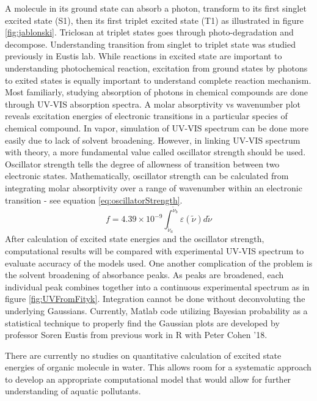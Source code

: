 \documentclass[
journal=jpcbfk, %
manuscript=article]{achemso}
\begin{document}
A molecule in its ground state can absorb a photon, transform to its first singlet excited state (S1), then its first triplet excited state (T1) as illustrated in figure \ref{fig:jablonski}. Triclosan at triplet states goes through photo-degradation and decompose. Understanding transition from singlet to triplet state was studied previously in Eustis lab.\cite{Ricke2014} While reactions in excited state are important to understanding photochemical reaction, excitation from ground states by photons to exited states is equally important to understand complete reaction mechanism. Most familiarly, studying absorption of photons in chemical compounds are done through UV-VIS absorption spectra. A molar absorptivity vs wavenumber plot reveals excitation energies of electronic transitions in a particular species of chemical compound. In vapor, simulation of UV-VIS spectrum can be done more easily due to lack of solvent broadening.\cite{Hirayama2010} However, in linking UV-VIS spectrum with theory, a more fundamental value called oscillator strength should be used. Oscillator strength tells the degree of allowness of transition between two electronic states. Mathematically, oscillator strength can be calculated from integrating molar absorptivity over a range of wavenumber within an electronic transition - see equation \ref{eq:oscillatorStrength}.\cite{Klan2009}
\begin{equation}
\label{eq:oscillatorStrength}
f = 4.39\times 10^{-9}\int_{\widetilde{\nu}_{a}}^{\widetilde{\nu}_{b}}\varepsilon(\widetilde{\nu}) d\widetilde{\nu}
\end{equation}
After calculation of excited state energies and the oscillator strength, computational results will be compared with experimental UV-VIS spectrum to evaluate accuracy of the models used. One another complication of the problem is the solvent broadening of absorbance peaks. As peaks are broadened, each individual peak combines together into a continuous experimental spectrum as in figure \ref{fig:UVFromFityk}. Integration cannot be done without deconvoluting the underlying Gaussians. Currently, Matlab code utilizing Bayesian probability as a statistical technique to properly find the Gaussian plots are developed by professor Soren Eustis from previous work in R with Peter Cohen '18.

 There are currently no studies on quantitative calculation of excited state energies of organic molecule in water. This allows room for a systematic approach to develop an appropriate computational model that would allow for further understanding of aquatic pollutants.
\end{document}
